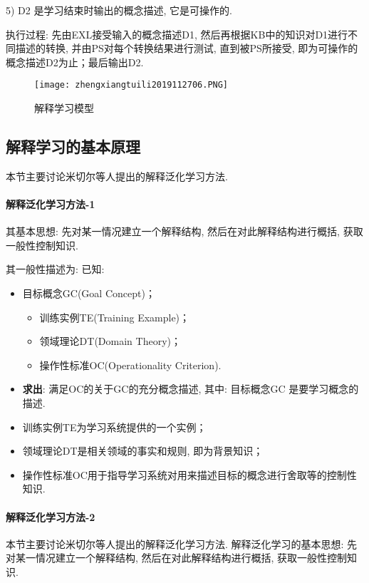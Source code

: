 5) D2 是学习结束时输出的概念描述, 它是可操作的.

执行过程: 先由EXL接受输入的概念描述D1, 然后再根据KB中的知识对D1进行不同描述的转换, 并由PS对每个转换结果进行测试, 直到被PS所接受, 即为可操作的概念描述D2为止；最后输出D2.

\begin{figure}[H]
\centering
\texttt{[image: zhengxiangtuili2019112706.PNG]}
\caption{解释学习模型}
\label{AI32fig2706}
\end{figure}
\subsection{解释学习的基本原理}
本节主要讨论米切尔等人提出的解释泛化学习方法.
\paragraph{解释泛化学习方法-1}
其基本思想: 先对某一情况建立一个解释结构, 然后在对此解释结构进行概括, 获取一般性控制知识.

其一般性描述为: 已知:
\begin{itemize}
\item 目标概念GC(Goal Concept)；
      \begin{itemize}
          \item 训练实例TE(Training Example)；
          \item 领域理论DT(Domain Theory)；
           \item 操作性标准OC(Operationality Criterion).
       \end{itemize}
\item \textbf{求出}: 满足OC的关于GC的充分概念描述, 其中: 目标概念GC 是要学习概念的描述.
\end{itemize}

\begin{itemize}
\item 训练实例TE为学习系统提供的一个实例；
\item 领域理论DT是相关领域的事实和规则, 即为背景知识；
\item 操作性标准OC用于指导学习系统对用来描述目标的概念进行舍取等的控制性知识.
\end{itemize}
\paragraph{解释泛化学习方法-2}
本节主要讨论米切尔等人提出的解释泛化学习方法.
解释泛化学习的基本思想: 先对某一情况建立一个解释结构, 然后在对此解释结构进行概括, 获取一般性控制知识.

